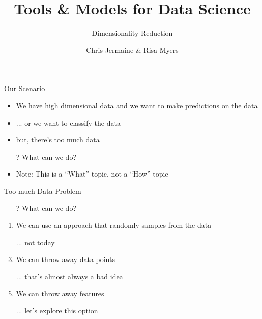 \documentclass[aspectratio=169]{beamer}
\title[]
{Tools \& Models for Data Science}
\subtitle{Dimensionality Reduction}
\author[]{Chris Jermaine \& Risa Myers}
\institute
{
  Rice University 
}
\date[]{}
\begin{document}
\begin{frame}
 \titlepage
\end{frame}
%
%	
\begin{frame}{Our Scenario}

\begin{itemize}
\item We have high dimensional data and we want to make predictions on the data
\item ... or we want to classify the data
\item but, there's too much data
\item[?] What can we do?
\item Note: This is a ``What'' topic, not a ``How'' topic
\end{itemize}
\end{frame}
\begin{frame}{Too much Data Problem}

\begin{itemize}
\item[?] What can we do?
\end{itemize}
\begin{enumerate}
\item We can use an approach that randomly samples from the data
\item[] ... not today
\item We can throw away data points %
\item[] ... that's almost always a bad idea
\item We can throw away features
\item[] ... let's explore this option
\end{enumerate}
\end{frame}
\end{document}
